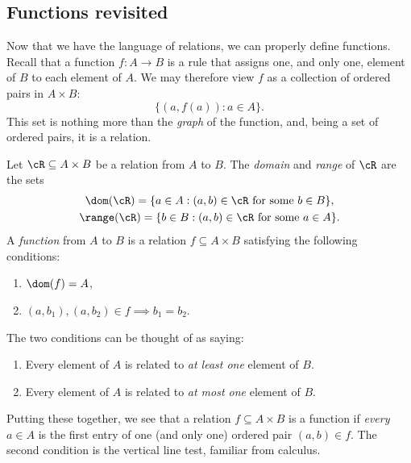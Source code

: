 \subsection{Functions revisited}\label{sec:func2}

Now that we have the language of relations, we can properly define functions. Recall that a function $f:A\to B$ is a rule that assigns one, and only one, element of $B$ to each element of $A$. We may therefore view $f$ as a collection of ordered pairs in $A\times B$:
\[\big\{(a,f(a)):a\in A\big\}.\]
This set is nothing more than the \emph{graph} of the function, and, being a set of ordered pairs, it is a relation.

\begin{defn}\label{defn:func}
Let $\cR\subseteq A\times B$ be a relation from $A$ to $B$. The \emph{domain} and \emph{range} of $\cR$ are the sets
\begin{gather*}
\dom(\cR)=\{a\in A:(a,b)\in \cR\text{ for some }b\in B\},\\
\range(\cR)=\{b\in B:(a,b)\in \cR\text{ for some }a\in A\}.
\end{gather*}
A \emph{function} from $A$ to $B$ is a relation $f\subseteq A\times B$ satisfying the following conditions:
\begin{enumerate}
  \item $\dom(f)=A$,
  \item $(a,b_1),(a,b_2)\in f\implies b_1=b_2$.
\end{enumerate}
\end{defn}

\noindent The two conditions can be thought of as saying:
\begin{enumerate}
  \item Every element of $A$ is related to \emph{at least one} element of $B$.
  \item Every element of $A$ is related to \emph{at most one} element of $B$.
\end{enumerate}
Putting these together, we see that a relation $f\subseteq A\times B$ is a function if \emph{every} $a\in A$ is the first entry of one (and only one) ordered pair $(a,b)\in f$. The second condition is the vertical line test, familiar from calculus.

